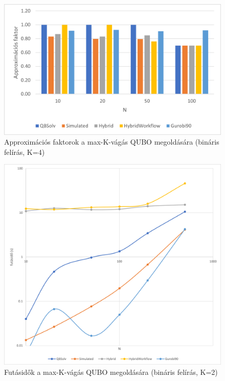 \begin{figure}[!ht]
	\centering
	\includegraphics[width=150mm, keepaspectratio]{figures/diagrams/maxKCutQUBO_K4approx_bin.png}
	\caption{Approximációs faktorok a max-K-vágás QUBO megoldására (bináris felírás, K=4)}
	\label{fig:maxKCutQUBO_K4approx_bin}
\end{figure}

\begin{figure}[!ht]
	\centering
	\includegraphics[width=150mm, keepaspectratio]{figures/diagrams/maxKCutQUBO_K2_bin.png}
	\caption{Futásidők a max-K-vágás QUBO megoldására (bináris felírás, K=2)}
	\label{fig:maxKCutQUBO_K2_bin}
\end{figure}

